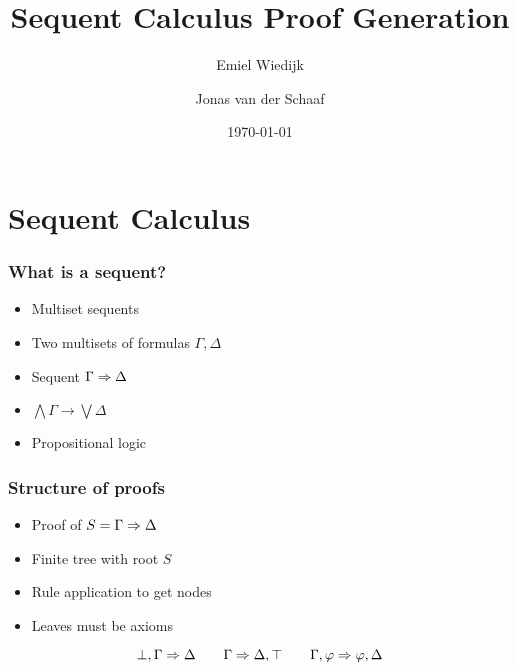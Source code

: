 \documentclass{beamer}
\title{Sequent Calculus Proof Generation}
\author{Emiel Wiedijk \and Jonas van der Schaaf}
\date{\today}
\begin{document}
\maketitle

\section{Sequent Calculus}

\begin{frame}
    \frametitle{What is a sequent?}

    \begin{itemize}
        \item Multiset sequents
        \item Two multisets of formulas \(\Gamma,\Delta\)
        \item Sequent \(\Gamma\Rightarrow\Delta\)
        \item \(\bigwedge\Gamma\to\bigvee\Delta\)
        \item Propositional logic
    \end{itemize}

\end{frame}

\begin{frame}
    \frametitle{Structure of proofs}

    \begin{itemize}
        \item Proof of \(S=\Gamma\Rightarrow\Delta\)
        \item Finite tree with root \(S\)
        \item Rule application to get nodes
        \item Leaves must be axioms
    \end{itemize}

    \[
        \bot,\Gamma\Rightarrow\Delta\qquad\Gamma\Rightarrow\Delta,\top\qquad\Gamma,\varphi\Rightarrow\varphi,\Delta
    \]

\end{frame}
\end{document}
